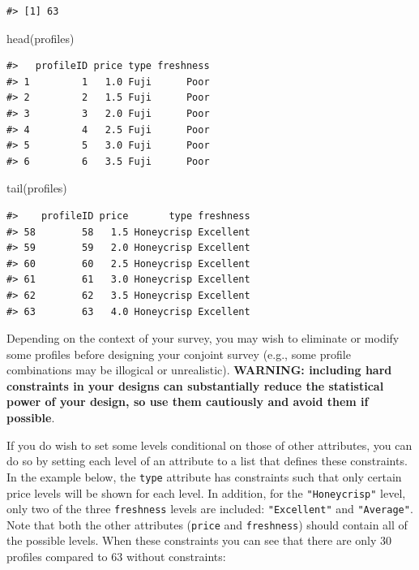 \documentclass[
  12pt,
]{article}
\newenvironment{Shaded}{\begin{snugshade}}{\end{snugshade}}
\newcommand{\FunctionTok}[1]{\textcolor[rgb]{0.00,0.00,0.00}{#1}}
\newcommand{\NormalTok}[1]{#1}
\begin{document}
\begin{verbatim}
#> [1] 63
\end{verbatim}

\begin{Shaded}
\begin{Highlighting}[]
\FunctionTok{head}\NormalTok{(profiles)}
\end{Highlighting}
\end{Shaded}

\begin{verbatim}
#>   profileID price type freshness
#> 1         1   1.0 Fuji      Poor
#> 2         2   1.5 Fuji      Poor
#> 3         3   2.0 Fuji      Poor
#> 4         4   2.5 Fuji      Poor
#> 5         5   3.0 Fuji      Poor
#> 6         6   3.5 Fuji      Poor
\end{verbatim}

\begin{Shaded}
\begin{Highlighting}[]
\FunctionTok{tail}\NormalTok{(profiles)}
\end{Highlighting}
\end{Shaded}

\begin{verbatim}
#>    profileID price       type freshness
#> 58        58   1.5 Honeycrisp Excellent
#> 59        59   2.0 Honeycrisp Excellent
#> 60        60   2.5 Honeycrisp Excellent
#> 61        61   3.0 Honeycrisp Excellent
#> 62        62   3.5 Honeycrisp Excellent
#> 63        63   4.0 Honeycrisp Excellent
\end{verbatim}

Depending on the context of your survey, you may wish to eliminate or
modify some profiles before designing your conjoint survey (e.g., some
profile combinations may be illogical or unrealistic). \textbf{WARNING:
including hard constraints in your designs can substantially reduce the
statistical power of your design, so use them cautiously and avoid them
if possible}.

If you do wish to set some levels conditional on those of other
attributes, you can do so by setting each level of an attribute to a
list that defines these constraints. In the example below, the
\texttt{type} attribute has constraints such that only certain price
levels will be shown for each level. In addition, for the
\texttt{"Honeycrisp"} level, only two of the three \texttt{freshness}
levels are included: \texttt{"Excellent"} and \texttt{"Average"}. Note
that both the other attributes (\texttt{price} and \texttt{freshness})
should contain all of the possible levels. When these constraints you
can see that there are only 30 profiles compared to 63 without
constraints:
\end{document}
